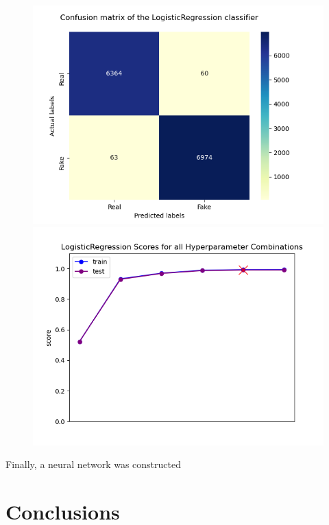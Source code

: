 \documentclass[10pt,twocolumn,letterpaper]{article}
\begin{document}
\begin{figure}[h]
   \begin{center}
        \includegraphics[width=\linewidth]{Latex_Report/report/Graphs/LR/confusion_matrix.png}
        \includegraphics[width=\linewidth]{Latex_Report/report/Graphs/LR/scores_plot.png}
   \end{center}
        \vspace*{-5mm}
        \caption{\label{fifth_figure}}
\end{figure}


Finally, a neural network was constructed 

\section{Conclusions}
\end{document}
